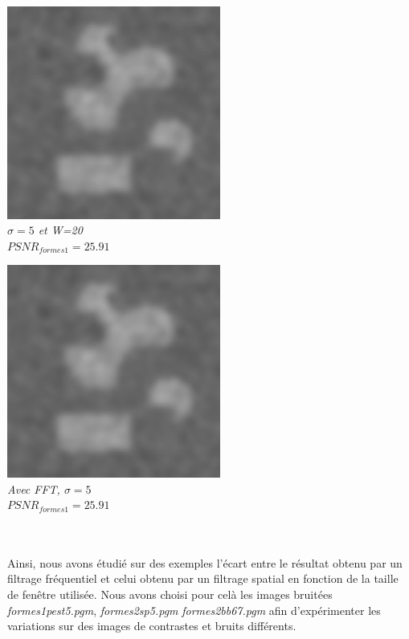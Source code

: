 \documentclass[a4,12pt]{article}
\begin{document}
\noindent
\begin{minipage}[c]{0.50\linewidth}
	\begin{center}
		\includegraphics[width = 70mm]{./img/2sp5-5-20.jpg}\\
		\textit{$\sigma=5$ et W=20}\\
		\textit{$PSNR_{formes1}=25.91$}
	\end{center}
\end{minipage}
\begin{minipage}[c]{0.50\linewidth}
	\begin{center}
		\includegraphics[width = 70mm]{./img/2sp5-5.jpg}\\
		\textit{Avec FFT, $\sigma=5$}\\
		\textit{$PSNR_{formes1}=25.91$}
	\end{center}
\end{minipage}\\
\\

Ainsi, nous avons étudié sur des exemples l'écart entre le résultat obtenu par un filtrage fréquentiel et celui obtenu par un filtrage spatial en fonction de la taille de fenêtre utilisée. Nous avons choisi pour celà les images bruitées \textit{formes1pest5.pgm}, \textit{formes2sp5.pgm} \textit{formes2bb67.pgm} afin d'expérimenter les variations sur des images de contrastes et bruits différents.
\end{document}
